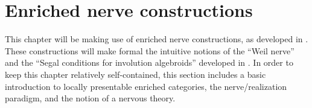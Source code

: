 %      



\section{Enriched nerve constructions}%
\label{sec:enriched-nerve-constructions}

This chapter will be making use of enriched nerve constructions, as developed in \cite{Bourke2019}. 
These constructions will make formal the intuitive notions of the ``Weil nerve'' and the ``Segal conditions for involution algebroids'' developed in . In order to keep this chapter relatively self-contained, this section includes a basic introduction to locally presentable enriched categories, the nerve/realization paradigm, and the notion of a nervous theory.

